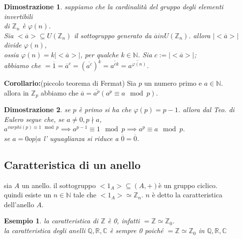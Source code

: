 \documentclass[a4paper,12pt]{article}
\theoremstyle{def}
\theoremstyle{prop}
\theoremstyle{esempio}
\newtheorem*{example}{Esempio}
\theoremstyle{dimostrazione}
\newtheorem*{dimostrazione}{Dimostrazione}
\theoremstyle{teo}
\theoremstyle{osservazione}
\begin{document}
\begin{dimostrazione}
    sappiamo che la cardinalità del gruppo degli elementi invertibili \\
    di \(\mathbb{Z}_n\) è \(\varphi(n)\).\\
    Sia \(<\overline{a}> \subseteq U(\mathbb{Z}_n)\) il sottogruppo generato da \(\overline{a} in U(\mathbb{Z}_n)\). allora \(|<\overline{a}>|\) divide \(\varphi(n)\),\\
    ossia \(\varphi(n) = k |<\overline{a}>|\), per qualche \(k \in \mathbb{N}\). Sia \(c := |<\overline{a}>|\);\\
    abbiamo che \( = \overline{1} = \overline{a}^c = (\overline{a^c})^k  = \overline{a^{ck}} = \overline{a^{\varphi(n)}} \).\\
\end{dimostrazione}

\textbf{Corollario:}(piccolo teorema di Fermat) Sia \(p\) un numero primo e \(a \in \mathbb{N}\).\\
allora in \(\mathbb{Z}_p\) abbiamo che \(\overline{a} = \overline{a^p} (a^p \equiv a \mod p)\).\\

\begin{dimostrazione}
    se \(p\) è primo si ha che \(\varphi(p) = p-1\). allora dal Teo. di Eulero segue che, se \(a \neq 0, p \nmid a\), \(a^{varphi(p) \equiv 1 \mod p}\implies a ^{p-1} \equiv 1 \mod p \implies a^p \equiv a \mod p\).\\
    se \(a = 0 o p | a\) l' uguaglianza si riduce a \(\overline{0} = \overline{0}\).
\end{dimostrazione}

\newpage

\subsection{Caratteristica di un anello}
sia \(A\) un anello. il sottogruppo \(<1_A> \subseteq (A,+)\)è un gruppo ciclico.\\
quindi esiste un \(n \in \mathbb{N}\) tale che \(<1_A> \simeq \mathbb{Z}_n\). \(n\) è detto la caratteristica dell'anello \(A\).\\

\begin{example}
    la caratteristica di \(\mathbb{Z}\) è 0, infatti \(<1> = \mathbb{Z} \simeq \mathbb{Z}_0\).\\
    la caratteristica degli anelli \(\mathbb{Q},\mathbb{R},\mathbb{C}\) è sempre 0 poiché \(<1> = \mathbb{Z} \simeq \mathbb{Z}_0\) in  \(\mathbb{Q},\mathbb{R},\mathbb{C}\)\\
\end{example}
\end{document}
